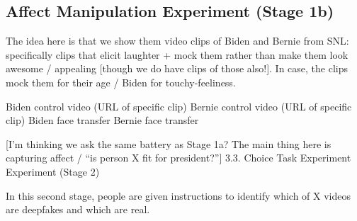 \subsection{Affect Manipulation Experiment (Stage 1b)}
The idea here is that we show them video clips of Biden and Bernie
from SNL: specifically clips that elicit laughter + mock them rather
than make them look awesome / appealing [though we do have clips of
  those also!]. In case, the clips mock them for their age / Biden for
touchy-feeliness.

Biden control video (URL of specific clip)
Bernie control video (URL of specific clip)
Biden face transfer
Bernie face transfer

[I’m thinking we ask the same battery as Stage 1a? The main thing here is capturing affect / “is person X fit for president?”] 
3.3. Choice Task Experiment Experiment (Stage 2)

In this second stage, people are given instructions to identify which of X videos are deepfakes and which are real.
